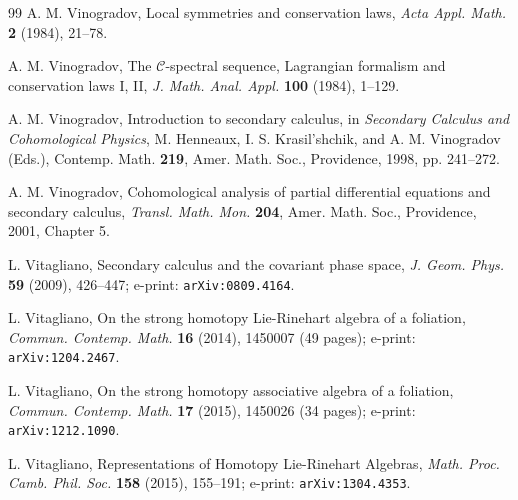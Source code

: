 \documentclass{conm-p-l}
\theoremstyle{definition}
\theoremstyle{remark}
\numberwithin{equation}{section}
\begin{document}
\begin{thebibliography}{99}
A.{} M.{} Vinogradov, Local symmetries and conservation laws, \emph{Acta Appl.{} Math.{}} \textbf{2} (1984), 21--78.

A.{} M.{} Vinogradov, The $\mathscr{C}$-spectral sequence,
Lagrangian formalism and conservation laws I, II, \emph{J.{} Math.{} Anal.{} Appl.{} }\textbf{100} (1984), 1--129.

A.{} M.{} Vinogradov, Introduction to secondary calculus, in
\emph{Secondary Calculus and Cohomological Physics}, M.{} Henneaux, I.{} S.{}
Krasil'shchik, and A.{} M.{} Vinogradov (Eds.), Contemp.{} Math.{}
\textbf{219}, Amer.{} Math.{} Soc., Providence, 1998, pp.{} 241--272.

A.{} M.{} Vinogradov, Cohomological analysis of partial
differential equations and secondary calculus, \emph{Transl.{} Math.{} Mon.{}
}\textbf{204}, Amer.{} Math.{} Soc., Providence, 2001, Chapter 5.

L.{} Vitagliano, Secondary calculus and the covariant phase
space, \emph{J.{} Geom.{} Phys.{}} \textbf{59} (2009), 426--447; e-print: \texttt{arXiv:0809.4164}.

L.{} Vitagliano, On the strong homotopy Lie-Rinehart algebra of
a foliation, \emph{Commun.{} Contemp.{} Math.{}} \textbf{16} (2014), 1450007 (49 pages); e-print: \texttt{arXiv:1204.2467}.

L.{} Vitagliano, On the strong homotopy associative algebra of a
foliation, \emph{Commun.{} Contemp.{} Math.{}} \textbf{17} (2015), 1450026 (34 pages); e-print: \texttt{arXiv:1212.1090}.

L.{} Vitagliano, Representations of Homotopy Lie-Rinehart Algebras, \emph{Math.{} Proc.{} Camb.{} Phil.{} Soc.{}} \textbf{158} (2015), 155--191; e-print: \texttt{arXiv:1304.4353}.

\end{thebibliography}
\end{document}
